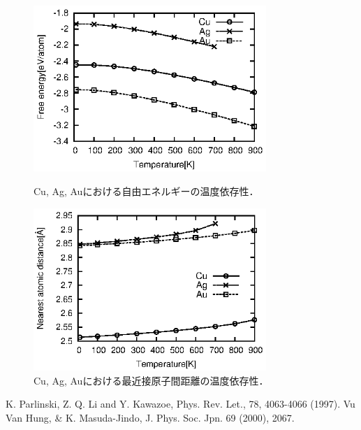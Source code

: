 \documentclass[12pt, a4paper]{jarticle}
\newcommand{\講演番号}
{}
\newcommand{\講演題目}
{非調和振動の効果を入れた有限温度自由エネルギー計算}
\newcommand{\英文題目}
{Free energy calculation of finite temperature with anharmonic effects.}
\newcommand{\和文所属}
{関西学院大・理工}
\newcommand{\和文氏名}
{榊原健，西谷滋人}
\newcommand{\英文所属}
{Department of Informatics, Kwansei Gakuin Univ}
\newcommand{\英文氏名}
{K. Sakakibara, S. R. Nishitani}
\newlength\題目幅
\newlength\ヘッダ項目間隔
\newlength\所属インデント
\newlength\和文氏名インデント
\newlength\英文氏名インデント
\newlength\最小所属氏名間隔
\newlength\ヘッダ行間隔
\newlength\本文行間隔
\newlength\上端余白
\newlength\左端余白
\begin{document}
\begin{center}
\begin{figure}[h]
\begin{minipage}{0.5\hsize}
\begin{center}
\includegraphics[width=8.8cm]{./energy.eps}
\caption{\small{Cu, Ag, Auにおける自由エネルギーの温度依存性．}}
\end{center}
\end{minipage}
\hspace{5mm}
\begin{minipage}{0.5\hsize}
\begin{center}
\includegraphics[width=8.8cm]{./distance.eps}
\caption{\small{Cu, Ag, Auにおける最近接原子間距離の温度依存性．}}
\end{center}
\end{minipage}
\end{figure}
\end{center}

\smallskip
{\small\setlength\baselineskip{10pt}	%
\begin{thebibliography}{9}
K. Parlinski, Z. Q. Li and Y. Kawazoe, Phys. Rev. Let., 78, 4063-4066 (1997).
Vu Van Hung, \& K. Masuda-Jindo, J. Phys. Soc. Jpn. 69 (2000), 2067.
\end{thebibliography}
}
\end{document}
